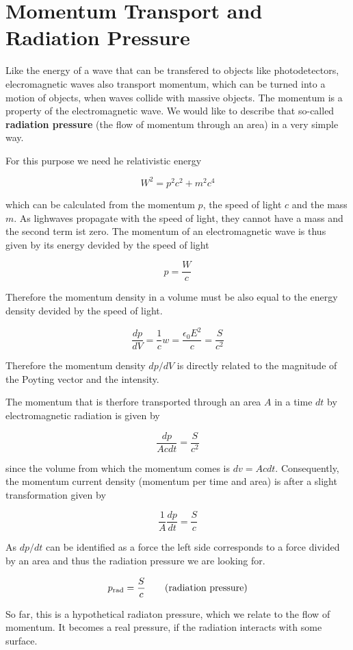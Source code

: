 \documentclass[
  a4paper,
]{book}
\begin{document}
\section{Momentum Transport and Radiation
Pressure}\label{momentum-transport-and-radiation-pressure}

Like the energy of a wave that can be transfered to objects like
photodetectors, elecromagnetic waves also transport momentum, which can
be turned into a motion of objects, when waves collide with massive
objects. The momentum is a property of the electromagnetic wave. We
would like to describe that so-called \textbf{radiation pressure} (the
flow of momentum through an area) in a very simple way.

For this purpose we need he relativistic energy

\[
W^2=p^2c^2+m^2c^4
\]

which can be calculated from the momentum \(p\), the speed of light
\(c\) and the mass \(m\). As lighwaves propagate with the speed of
light, they cannot have a mass and the second term ist zero. The
momentum of an electromagnetic wave is thus given by its energy devided
by the speed of light

\[
p=\frac{W}{c}
\]

Therefore the momentum density in a volume must be also equal to the
energy density devided by the speed of light.

\[
\frac{dp}{dV}=\frac{1}{c}w=\frac{\epsilon_0 E^2}{c}=\frac{S}{c^2}
\]

Therefore the momentum density \(dp/dV\) is directly related to the
magnitude of the Poyting vector and the intensity.

The momentum that is therfore transported through an area \(A\) in a
time \(dt\) by electromagnetic radiation is given by

\[
\frac{dp}{A c dt}=\frac{S}{c^2}
\]

since the volume from which the momentum comes is \(dv=A c dt\).
Consequently, the momentum current density (momentum per time and area)
is after a slight transformation given by

\[
\frac{1}{A}\frac{dp}{dt}=\frac{S}{c}
\]

As \(dp/dt\) can be identified as a force the left side corresponds to a
force divided by an area and thus the radiation pressure we are looking
for.

\[
p_{\rm rad}=\frac{S}{c}
\tag{radiation pressure}
\]

So far, this is a hypothetical radiaton pressure, which we relate to the
flow of momentum. It becomes a real pressure, if the radiation interacts
with some surface.
\end{document}
